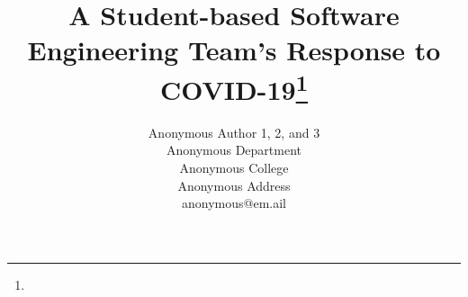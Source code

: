 \documentclass{article}
\title{A Student-based Software Engineering Team's Response to COVID-19\footnote{\protect}}
\author{
Anonymous Author 1, 2, and 3\\
Anonymous Department\\
Anonymous College\\
Anonymous Address\\
anonymous@em.ail\\


}
\begin{document}
\maketitle

\begin{abstract}
 
\end{abstract}


% 





\medskip



\end{document}
